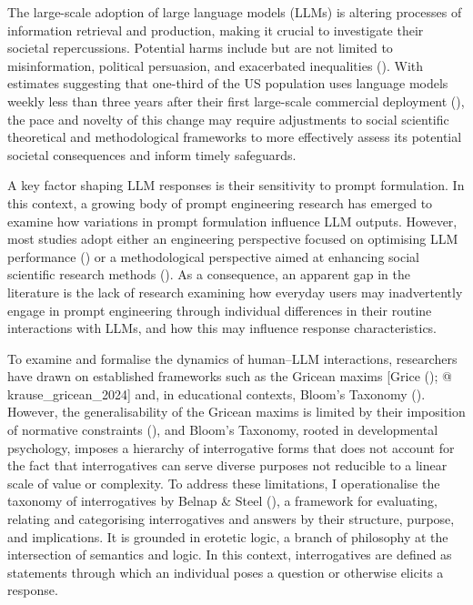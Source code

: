 \documentclass[
  12pt,
]{article}
\begin{document}
The large-scale adoption of large language models (LLMs) is altering processes of information retrieval and production, making it crucial to investigate their societal repercussions. Potential harms include but are not limited to misinformation, political persuasion, and exacerbated inequalities (). With estimates suggesting that one-third of the US population uses language models weekly less than three years after their first large-scale commercial deployment (), the pace and novelty of this change may require adjustments to social scientific theoretical and methodological frameworks to more effectively assess its potential societal consequences and inform timely safeguards.

A key factor shaping LLM responses is their sensitivity to prompt formulation. In this context, a growing body of prompt engineering research has emerged to examine how variations in prompt formulation influence LLM outputs. However, most studies adopt either an engineering perspective focused on optimising LLM performance () or a methodological perspective aimed at enhancing social scientific research methods (). As a consequence, an apparent gap in the literature is the lack of research examining how everyday users may inadvertently engage in prompt engineering through individual differences in their routine interactions with LLMs, and how this may influence response characteristics.

To examine and formalise the dynamics of human--LLM interactions, researchers have drawn on established frameworks such as the Gricean maxims {[}Grice (); @ krause\_gricean\_2024{]} and, in educational contexts, Bloom's Taxonomy (). However, the generalisability of the Gricean maxims is limited by their imposition of normative constraints (), and Bloom's Taxonomy, rooted in developmental psychology, imposes a hierarchy of interrogative forms that does not account for the fact that interrogatives can serve diverse purposes not reducible to a linear scale of value or complexity. To address these limitations, I operationalise the taxonomy of interrogatives by Belnap \& Steel (), a framework for evaluating, relating and categorising interrogatives and answers by their structure, purpose, and implications. It is grounded in erotetic logic, a branch of philosophy at the intersection of semantics and logic. In this context, interrogatives are defined as statements through which an individual poses a question or otherwise elicits a response.
\end{document}
